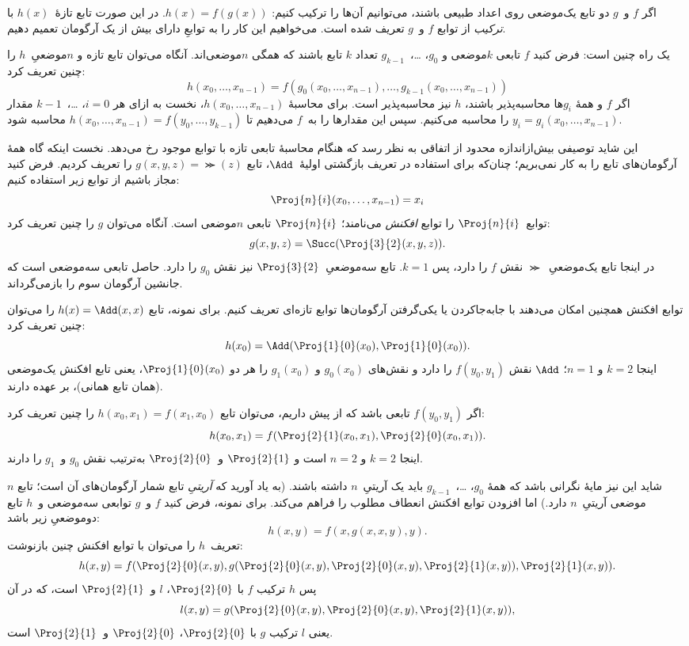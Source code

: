\documentclass[../../../include/open-logic-section]{subfiles}
\begin{document}

اگر $f$ و~$g$ دو تابع یک‌موضعی روی اعداد طبیعی باشند، می‌توانیم آن‌ها
را ترکیب کنیم: $h(x)=f(g(x))$. در این صورت تابع تازهٔ~$h(x)$ با
\emph{ترکیب} از توابع $f$ و~$g$ تعریف شده است. می‌خواهیم این کار را
به توابعِ دارای بیش از یک آرگومان تعمیم دهیم.

یک راه چنین است: فرض کنید $f$ تابعی $k$موضعی و
$g_0$، \dots،~$g_{k-1}$ تعداد $k$ تابع باشند که همگی $n$موضعی‌اند.
آنگاه می‌توان تابع تازه و $n$موضعیِ~$h$ را چنین تعریف کرد:
\[
h(x_0, \dots, x_{n-1}) =
f(g_0(x_0, \dots, x_{n-1}), \dots, g_{k-1}(x_0, \dots, x_{n-1}))
\]
اگر $f$ و همهٔ $g_i$ها محاسبه‌پذیر باشند، $h$ نیز محاسبه‌پذیر است.
برای محاسبهٔ $h(x_0,\dots,x_{n-1})$، نخست به ازای هر
$i=0$، \dots،~$k-1$ مقدار
$y_i=g_i(x_0,\dots,x_{n-1})$ را محاسبه می‌کنیم. سپس این مقدارها را
به~$f$ می‌دهیم تا
$h(x_0,\dots,x_{n-1})=f(y_0,\dots,y_{k-1})$ محاسبه شود.

این شاید توصیفی بیش‌ازاندازه محدود از اتفاقی به نظر رسد که هنگام
محاسبهٔ تابعی تازه با توابع موجود رخ می‌دهد. نخست اینکه گاه همهٔ
آرگومان‌های تابع را به کار نمی‌بریم؛ چنان‌که برای استفاده در تعریف
بازگشتی اولیهٔ~$\Add$، تابع $g(x,y,z)=\Succ(z)$ را تعریف کردیم. فرض
کنید مجاز باشیم از توابع زیر استفاده کنیم:
\[
\Proj{n}{i}(x_0, \dots, x_{n-1}) = x_i
\]
توابع~$\Proj{n}{i}$ را توابع \emph{افکنش} می‌نامند؛
$\Proj{n}{i}$ تابعی $n$موضعی است. آنگاه می‌توان $g$ را چنین تعریف
کرد:
\[
g(x, y, z) = \Succ(\Proj{3}{2}(x, y, z)).
\]
در اینجا تابع یک‌موضعیِ~$\Succ$ نقش $f$ را دارد، پس $k=1$. تابع
سه‌موضعیِ~$\Proj{3}{2}$ نیز نقش $g_0$ را دارد. حاصل تابعی سه‌موضعی
است که جانشین آرگومان سوم را بازمی‌گرداند.

توابع افکنش همچنین امکان می‌دهند با جابه‌جاکردن یا یکی‌گرفتن
آرگومان‌ها توابع تازه‌ای تعریف کنیم. برای نمونه، تابع
$h(x)=\Add(x,x)$ را می‌توان چنین تعریف کرد:
\[
h(x_0) = \Add(\Proj{1}{0}(x_0),\Proj{1}{0}(x_0)).
\]
اینجا $k=2$ و $n=1$؛ $\Add$ نقش $f(y_0,y_1)$ را دارد و نقش‌های
$g_0(x_0)$ و $g_1(x_0)$ را هر دو $\Proj{1}{0}(x_0)$، یعنی تابع
افکنش یک‌موضعی (همان تابع همانی)، بر عهده دارند.

اگر $f(y_0,y_1)$ تابعی باشد که از پیش داریم، می‌توان تابع
$h(x_0,x_1)=f(x_1,x_0)$ را چنین تعریف کرد:
\[
h(x_0, x_1) = f(\Proj{2}{1}(x_0, x_1),\Proj{2}{0}(x_0, x_1)).
\]
اینجا $k=2$ و $n=2$ است و $\Proj{2}{1}$ و~$\Proj{2}{0}$ به‌ترتیب
نقش $g_0$ و~$g_1$ را دارند.

شاید این نیز مایهٔ نگرانی باشد که همهٔ
$g_0$، \dots،~$g_{k-1}$ باید یک آریتیِ~$n$ داشته باشند. (به یاد
آورید که \emph{آریتیِ} تابع شمار آرگومان‌های آن است؛ تابع
$n$موضعی آریتیِ~$n$ دارد.) اما افزودن توابع افکنش انعطاف مطلوب را
فراهم می‌کند. برای نمونه، فرض کنید $f$ و~$g$ توابعی سه‌موضعی و~$h$
تابع دوموضعیِ زیر باشد:
\[
h(x,y) = f(x,g(x,x,y),y).
\]
تعریف~$h$ را می‌توان با توابع افکنش چنین بازنوشت:
\[
h(x,y) = f(\Proj{2}{0}(x,y), g(\Proj{2}{0}(x,y), \Proj{2}{0}(x,y),
\Proj{2}{1}(x,y)), \Proj{2}{1}(x,y)).
\]
پس $h$ ترکیب $f$ با $\Proj{2}{0}$، $l$ و~$\Proj{2}{1}$ است، که در آن
\[
l(x,y) = g(\Proj{2}{0}(x,y),\Proj{2}{0}(x,y),\Proj{2}{1}(x,y)),
\]
یعنی $l$ ترکیب $g$ با $\Proj{2}{0}$، $\Proj{2}{0}$ و~$\Proj{2}{1}$
است.
\end{document}
